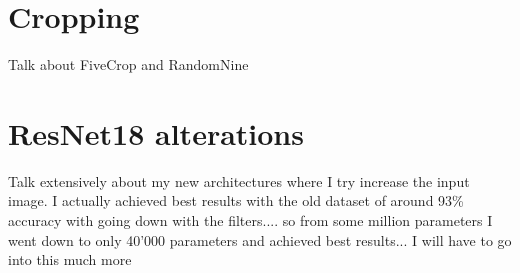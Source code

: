 \begin{table}[h]
    \caption{Accuracy (\%) for several learning rates and lr-decays for CNN\_Basic as a baseline.}
    \centering
    \begin{small}
	\textsc{
	}
    \end{small}
    \vspace{-3.9mm}
    \label{tbl:cnn-basic-baseline}
\end{table}

\section{Cropping}

Talk about FiveCrop and RandomNine

\section{ResNet18 alterations}

Talk extensively about my new architectures where I try increase the input image. I actually achieved best results with the old dataset of around 93\% accuracy with going down with the filters.... so from some million parameters I went  down to only 40'000 parameters and achieved best results... I will have to go into this much more